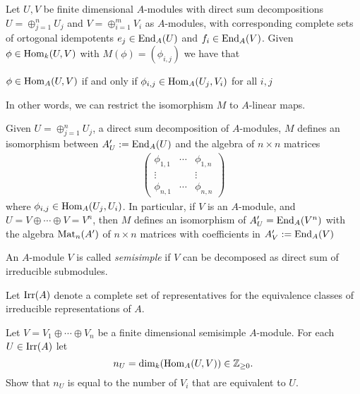 \begin{prop}
Let \(U,V\) be finite dimensional \(A\)-modules with direct sum decompositions \(U=\oplus _{j=1}^nU_{j}\) and \(V=\oplus _{i=1}^mV_{i}\) as \(A\)-modules, with corresponding complete sets of ortogonal idempotents \(e_{j}\in \operatorname{End}_A(U)\) and \(f_{i}\in \operatorname{End}_A(V)\). Given \(\phi \in \operatorname{Hom}_{k}(U,V)\) with \(M(\phi )=(\phi _{i,j})\) we have that

\(\phi \in \operatorname{Hom}_A(U,V)\) if and only if \(\phi _{i,j}\in \operatorname{Hom}_A(U_{j},V_{i})\) for all \(i,j\)

In other words, we can restrict the isomorphism \(M\) to \(A\)-linear maps.
\end{prop}
\newpage
\begin{prop}
Given \(U=\oplus _{j=1}^n U_{j}\), a direct sum decomposition of \(A\)-modules, \(M\) defines an isomorphism between \(A_U':=\operatorname{End}_A(U)\) and the algebra of \(n\times n\) matrices
\begin{gather*}
\begin{pmatrix}\phi _{1,1}&\cdots &\phi _{1,n} \\
\vdots &&\vdots \\
\phi _{n,1}&\cdots &\phi _{n,n}\end{pmatrix}
\end{gather*}
where \(\phi _{i,j}\in \operatorname{Hom}_A(U_{j},U_{i})\). In particular, if \(V\) is an \(A\)-module, and \(U=V\oplus \cdots \oplus V=V^n\), then \(M\) defines an isomorphism of \(A_U'=\operatorname{End}_A(V^n)\) with the algebra \(\operatorname{Mat}_{n}(A')\) of \(n\times n\) matrices with coefficients in \(A_V':=\operatorname{End}_A(V)\)
\end{prop}

\begin{defn}
An \(A\)-module \(V\) is called \emph{semisimple} if \(V\) can be decomposed as direct sum of irreducible submodules.
\end{defn}

\begin{defn}
Let \(\operatorname{Irr}(A)\) denote a complete set of representatives for the equivalence classes of irreducible representations of \(A\).
\end{defn}


\begin{prop}
Let \(V=V_{1}\oplus \cdots \oplus V_{n}\) be a finite dimensional semisimple \(A\)-module. For each \(U\in \operatorname{Irr}(A)\) let
\[
n_U=\dim_{k}(\operatorname{Hom}_A(U,V))\in \Bbb{Z}_{\geq 0}.
\]
Show that \(n_U\) is equal to the number of \(V_{i}\) that are equivalent to \(U\).
\end{prop}

